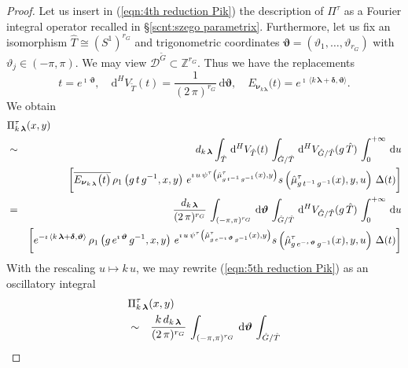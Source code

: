 \documentclass[12pt,a4paper]{article}
\theoremstyle{plain}
\theoremstyle{definition}
\begin{document}
\begin{proof}
Let us insert in (\ref{eqn:4th reduction Pik}) the description of $\Pi^\tau$ as a Fourier integral operator recalled in \S \ref{scnt:szego parametrix}.
Furthermore, let us fix an isomorphism 
$\hat{T}\cong (S^1)^{r_G}$ and trigonometric coordinates
$\boldsymbol{\vartheta}=(\vartheta_1,\ldots,\vartheta_{r_G})$
with $\vartheta_j\in (-\pi,\pi)$. We may view
$\mathcal{D}^{\tilde{G}}\subset \mathbb{Z}^{r_G}$.
Thus we have the replacements
$$
t=e^{\imath\,\boldsymbol{\vartheta}},\quad
\mathrm{d}^HV_{\tilde{T}}(t)=\frac{1}{(2\,\pi)^{r_G}}\,
\mathrm{d}\boldsymbol{\vartheta},\quad
E_{\boldsymbol{\nu}_{k\,\boldsymbol{\lambda}}}
\big(t\big)=e^{\imath\,\langle k\,\boldsymbol{\lambda}
+\boldsymbol{\delta},\boldsymbol{\vartheta}\rangle}.
$$
We obtain
\begin{eqnarray}
\label{eqn:5th reduction Pik}
\lefteqn{\Pi^\tau_{k\,\boldsymbol{\lambda}}(x,y)}\\
&\sim&
d_{k\,\boldsymbol{\lambda}}
\int_{\hat{T}}\,\mathrm{d}^HV_{\hat{T}}(t)\,\int_{\hat{G}/\hat{T}}
\,\mathrm{d}^H V_{\hat{G}/\hat{T}}(g\,\hat{T})\,
\int_0^{+\infty}\,\mathrm{d}u\nonumber\\
&&\left[\overline{E_{\boldsymbol{\nu}_{k\,\boldsymbol{\lambda}}}
\big(t\big)}
\,\rho_1\left(g\,t\,g^{-1},x,y\right)\,
e^{\imath\,u\,\psi^\tau\left( \hat{\mu}^\tau_{g\,t^{-1}\,g^{-1}}(x),y   \right) }
s\left(\hat{\mu}^\tau_{g\,t^{-1}\,g^{-1}}(x),y,u   \right)
\,\Delta(t)\right]\nonumber\\
&=&\frac{ d_{k\,\boldsymbol{\lambda}}}{(2\,\pi)^{r_G}}\,
\int_{(-\pi,\pi)^{r_G}}\,\mathrm{d}\boldsymbol{\vartheta}\,\int_{\hat{G}/\hat{T}}
\,\mathrm{d}^H V_{\hat{G}/\hat{T}}(g\,\hat{T})\,
\int_0^{+\infty}\,\mathrm{d}u\nonumber\\
&&\left[e^{-\imath\,\langle k\,\boldsymbol{\lambda}
+\boldsymbol{\delta},\boldsymbol{\vartheta}\rangle}
\,\rho_1\left(g\,e^{\imath\,\boldsymbol{\vartheta}}\,g^{-1},x,y\right)\,
e^{\imath\,u\,\psi^\tau \left(\hat{\mu}^\tau_{g\,e^{-\imath\,\boldsymbol{\vartheta}}\,g^{-1}}(x),y    \right)}
s\left(\hat{\mu}^\tau_{g\,e^{-\imath\,\boldsymbol{\vartheta}}\,g^{-1}}(x),y,u   \right)
\,\Delta(t)\right]\nonumber
\end{eqnarray} 
%
With the rescaling $u\mapsto k\,u$, we may rewrite
(\ref{eqn:5th reduction Pik}) as an oscillatory integral
\begin{eqnarray}
\label{eqn:6th reduction Pik}
\lefteqn{\Pi^\tau_{k\,\boldsymbol{\lambda}}(x,y)}\\
&\sim&\frac{ k\,d_{k\,\boldsymbol{\lambda}}}{(2\,\pi)^{r_G}}\,
\int_{(-\pi,\pi)^{r_G}}\,\mathrm{d}\boldsymbol{\vartheta}\,\int_{\hat{G}/\hat{T}}

\end{eqnarray}
\end{proof}
\end{document}
